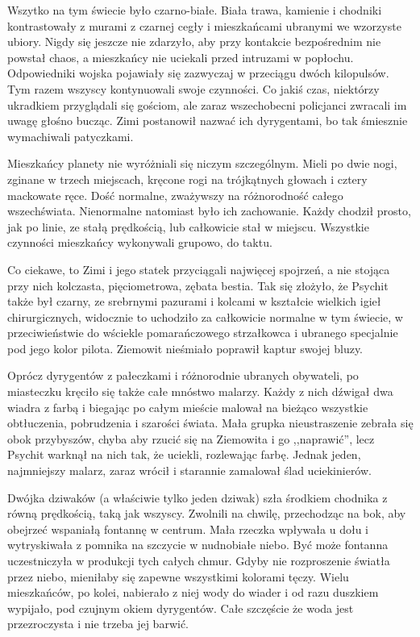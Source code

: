 Wszytko na tym świecie było czarno-białe. Biała trawa, kamienie i chodniki kontrastowały z murami z czarnej cegły i mieszkańcami ubranymi we wzorzyste ubiory.
Nigdy się jeszcze nie zdarzyło, aby przy kontakcie bezpośrednim nie powstał chaos, a mieszkańcy nie uciekali przed intruzami w popłochu. 
Odpowiedniki wojska pojawiały się zazwyczaj w przeciągu dwóch kilopulsów.
Tym razem wszyscy kontynuowali swoje czynności.
Co jakiś czas, niektórzy ukradkiem przyglądali się gościom, ale zaraz wszechobecni policjanci zwracali im uwagę głośno bucząc.
Zimi postanowił nazwać ich dyrygentami, bo tak śmiesznie wymachiwali patyczkami.

Mieszkańcy planety nie wyróżniali się niczym szczególnym. Mieli po dwie nogi, zginane w trzech miejscach, kręcone rogi na trójkątnych głowach i cztery mackowate ręce.
Dość normalne, zważywszy na różnorodność całego wszechświata.
Nienormalne natomiast było ich zachowanie. Każdy chodził prosto, jak po linie, ze stałą prędkością, lub całkowicie stał w miejscu.
Wszystkie czynności mieszkańcy wykonywali grupowo, do taktu.

Co ciekawe, to Zimi i jego statek przyciągali najwięcej spojrzeń, a nie stojąca przy nich kolczasta, pięciometrowa, zębata bestia.
Tak się złożyło, że Psychit także był czarny, ze srebrnymi pazurami i kolcami w kształcie wielkich igieł chirurgicznych, 
widocznie to uchodziło za całkowicie normalne w tym świecie, w przeciwieństwie do wściekle pomarańczowego strzałkowca i
ubranego specjalnie pod jego kolor pilota. Ziemowit nieśmiało poprawił kaptur swojej bluzy.

Oprócz dyrygentów z pałeczkami i różnorodnie ubranych obywateli, po miasteczku kręciło się także całe mnóstwo malarzy.
Każdy z nich dźwigał dwa wiadra z farbą i biegając po całym mieście malował na bieżąco wszystkie obtłuczenia, pobrudzenia i szarości świata.
Mała grupka nieustraszenie zebrała się obok przybyszów, chyba aby rzucić się na Ziemowita i go ,,naprawić'', lecz Psychit warknął na nich tak, że uciekli, rozlewając farbę.
Jednak jeden, najmniejszy malarz, zaraz wrócił i starannie zamalował ślad uciekinierów.

\divider{}

Dwójka dziwaków (a właściwie tylko jeden dziwak) szła środkiem chodnika z równą prędkością, taką jak wszyscy.
Zwolnili na chwilę, przechodząc na bok, aby obejrzeć wspaniałą fontannę w centrum.
Mała rzeczka wpływała u dołu i wytryskiwała z pomnika na szczycie w nudnobiałe niebo.
Być może fontanna uczestniczyła w produkcji tych całych chmur.
Gdyby nie rozproszenie światła przez niebo, mieniłaby się zapewne wszystkimi kolorami tęczy.
Wielu mieszkańców, po kolei, nabierało z niej wody do wiader i od razu duszkiem wypijało, pod czujnym okiem dyrygentów.
Całe szczęście że woda jest przezroczysta i nie trzeba jej barwić.

